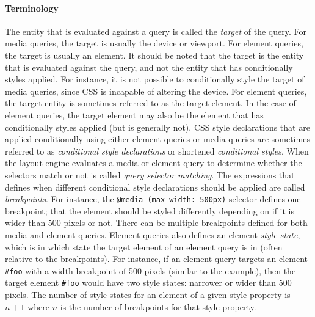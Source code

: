 \documentclass[a4paper,11pt]{kth-mag}
\newcommand{\code}[1]{\texttt{#1}}
\begin{document}
      \paragraph{Terminology}
      The entity that is evaluated against a query is called the \emph{target} of the query.
      For \gls{media queries}, the target is usually the device or \gls{viewport}.
      For element queries, the target is usually an \gls{element}.
      It should be noted that the target is the entity that is evaluated against the query, and not the entity that has conditionally styles applied.
      For instance, it is not possible to conditionally style the target of \gls{media queries}, since \gls{CSS} is incapable of altering the device.
      For element queries, the target entity is sometimes referred to as the target \gls{element}.
      In the case of element queries, the target element may also be the element that has conditionally styles applied (but is generally not).
      \gls{CSS} style declarations that are applied conditionally using either element queries or \gls{media queries} are sometimes referred to as \emph{conditional style declarations} or shortened \emph{conditional styles}.
      When the \gls{layout engine} evaluates a media or element query to determine whether the selectors match or not is called \emph{query selector matching}.
      The expressions that defines when different conditional style declarations should be applied are called \emph{breakpoints}.
      For instance, the  \code{@media (max-width: 500px)} selector defines one breakpoint; that the element should be styled differently depending on if it is wider than 500 pixels or not.
      There can be multiple breakpoints defined for both media and element queries.
      Element queries also defines an element \emph{style state}, which is in which state the target element of an element query is in (often relative to the breakpoints).
      For instance, if an element query targets an element \code{\#foo} with a width breakpoint of 500 pixels (similar to the  example), then the target element \code{\#foo} would have two style states: narrower or wider than 500 pixels.
      The number of style states for an element of a given style property is $n + 1$ where $n$ is the number of breakpoints for that style property.
\end{document}
